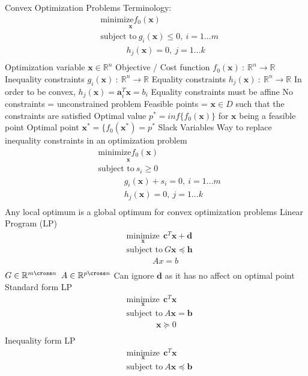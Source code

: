 \documentclass[14pt]{extarticle}
\begin{document}
\begin{outline}
		\1	Convex Optimization Problems
			\2	Terminology:	\begin{align*}
													& \underset{\bm{x}}{\text{minimize} f_0(\bm{x})}	\\		
													& \text{subject to}~
													 g_i(\bm{x}) \le 0,~i=1...m \\
													 &~~~~~~~~~~~~~~h_j(\bm{x}) = 0,~j=1...k \\
												\end{align*}
				\3	Optimization variable $\bm{x} \in \mathbb{R}^n$
				\3	Objective / Cost function $f_0(\bm{x})~:~\mathbb{R}^n \rightarrow \mathbb{R}$
				\3	Inequality constraints $g_i(\bm{x})~:~\mathbb{R}^n \rightarrow \mathbb{R}$
				\3	Equality constraints $h_j(\bm{x})~:~\mathbb{R}^n \rightarrow \mathbb{R}$
					\4	In order to be convex, $h_j(\bm{x}) = \bm{a}_i^T\bm{x} = b_i$ 
					\4	Equality constraints must be affine
				\3	No constraints = unconstrained problem
				\3	Feasible points = $\bm{x} \in D$ such that the constraints are satisfied
				\3	Optimal value $p^* = inf \{f_0(\bm{x})\}$ for $\bm{x}$ being a feasible point
				\3	Optimal point $\bm{x}^* = \{f_0(\bm{x}^*) = p^*$
				\3	Slack Variables
					\4	Way to replace inequality constraints in an optimization problem
					\4	\begin{align*}
							& \underset{\bm{x}}{\text{minimize} f_0(\bm{x})}	\\		
							& \text{subject to}~s_i \ge 0 \\
							&~~~~~~~~~~~~~~g_i(\bm{x}) + s_i =  0,~i=1...m \\
							&~~~~~~~~~~~~~~h_j(\bm{x}) = 0,~j=1...k \\
						\end{align*}
				\3	Any local optimum is a global optimum for convex optimization problems
		\2	Linear Program (LP)
			\3		\begin{align*}
							& \underset{\bm{x}}{\text{minimize}}~~\bm{c}^T\bm{x} + \bm{d}	\\		
							& \text{subject to}~G\bm{x} \preceq \bm{h} \\
							&~~~~~~~~~~~~~~Ax = b\\
						\end{align*}
			\3	$G \in \mathbb{R}^{m \cross n}$
			\3	$A \in \mathbb{R}^{p \cross n}$
			\3	Can ignore $\bm{d}$ as it has no affect on optimal point
			\3	Standard form LP
				\4	\begin{align*}	
							& \underset{\bm{x}}{\text{minimize}}~~\bm{c}^T\bm{x}	\\		
							& \text{subject to}~A\bm{x} = \bm{b} \\
							&~~~~~~~~~~~~~~~~\bm{x} \succeq 0\\
						\end{align*}
			\3	Inequality form LP
				\4	\begin{align*}	
							& \underset{\bm{x}}{\text{minimize}}~~\bm{c}^T\bm{x}	\\		
							& \text{subject to}~A\bm{x} \preceq \bm{b} \\
						\end{align*}
		

\end{outline}
\end{document}
